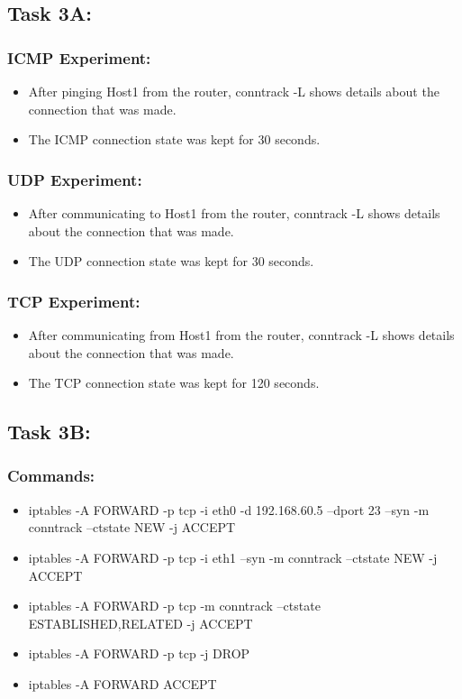 \documentclass[11pt]{article}
\begin{document}
\subsection*{Task 3A:}
\label{sec:org26e9fd5}
\subsubsection*{ICMP Experiment:}
\label{sec:org6531321}
\begin{itemize}
\item After pinging Host1 from the router, conntrack -L shows details about the connection that was made.
\item The ICMP connection state was kept for 30 seconds.
\end{itemize}
\subsubsection*{UDP Experiment:}
\label{sec:org29713bd}
\begin{itemize}
\item After communicating to Host1 from the router, conntrack -L shows details about the connection that was made.
\item The UDP connection state was kept for 30 seconds.
\end{itemize}
\subsubsection*{TCP Experiment:}
\label{sec:org217831f}
\begin{itemize}
\item After communicating from Host1 from the router, conntrack -L shows details about the connection that was made.
\item The TCP connection state was kept for 120 seconds.
\end{itemize}
\subsection*{Task 3B:}
\label{sec:org53765da}
\subsubsection*{Commands:}
\label{sec:org79ab2a2}
\begin{itemize}
\item iptables -A FORWARD -p tcp -i eth0 -d 192.168.60.5 --dport 23 --syn -m conntrack --ctstate NEW -j ACCEPT
\item iptables -A FORWARD -p tcp -i eth1 --syn -m conntrack --ctstate NEW -j ACCEPT
\item iptables -A FORWARD -p tcp -m conntrack --ctstate ESTABLISHED,RELATED -j ACCEPT
\item iptables -A FORWARD -p tcp -j DROP
\item iptables -A FORWARD ACCEPT
\end{itemize}
\end{document}
